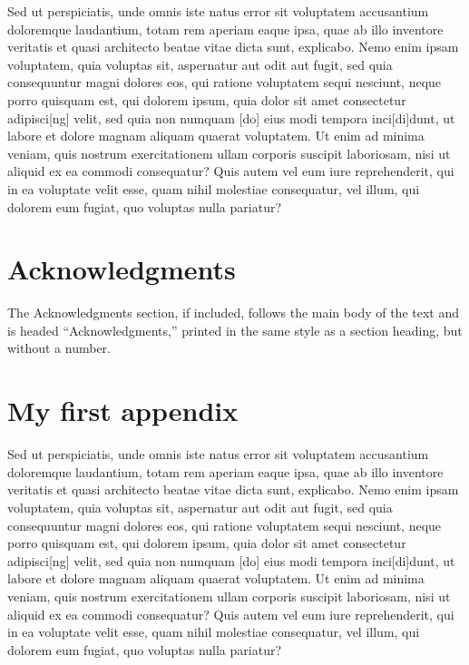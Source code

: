 \documentclass[a4paper,11pt]{article}
\begin{document}
Sed ut perspiciatis, unde omnis iste natus error sit voluptatem accusantium doloremque laudantium, totam rem aperiam eaque ipsa, quae ab illo inventore veritatis et quasi architecto beatae vitae dicta sunt, explicabo. Nemo enim ipsam voluptatem, quia voluptas sit, aspernatur aut odit aut fugit, sed quia consequuntur magni dolores eos, qui ratione voluptatem sequi nesciunt, neque porro quisquam est, qui dolorem ipsum, quia dolor sit amet consectetur adipisci[ng] velit, sed quia non numquam [do] eius modi tempora inci[di]dunt, ut labore et dolore magnam aliquam quaerat voluptatem. Ut enim ad minima veniam, quis nostrum exercitationem ullam corporis suscipit laboriosam, nisi ut aliquid ex ea commodi consequatur? Quis autem vel eum iure reprehenderit, qui in ea voluptate velit esse, quam nihil molestiae consequatur, vel illum, qui dolorem eum fugiat, quo voluptas nulla pariatur?


\section*{Acknowledgments}

The Acknowledgments section, if included,
		       follows the main body of the text and is headed
		       ``Acknowledgments,'' printed in the same style
		       as a section heading, but without a number.

\appendix

\section{My first appendix }

Sed ut perspiciatis, unde omnis iste natus error sit voluptatem accusantium doloremque laudantium, totam rem aperiam eaque ipsa, quae ab illo inventore veritatis et quasi architecto beatae vitae dicta sunt, explicabo. Nemo enim ipsam voluptatem, quia voluptas sit, aspernatur aut odit aut fugit, sed quia consequuntur magni dolores eos, qui ratione voluptatem sequi nesciunt, neque porro quisquam est, qui dolorem ipsum, quia dolor sit amet consectetur adipisci[ng] velit, sed quia non numquam [do] eius modi tempora inci[di]dunt, ut labore et dolore magnam aliquam quaerat voluptatem. Ut enim ad minima veniam, quis nostrum exercitationem ullam corporis suscipit laboriosam, nisi ut aliquid ex ea commodi consequatur? Quis autem vel eum iure reprehenderit, qui in ea voluptate velit esse, quam nihil molestiae consequatur, vel illum, qui dolorem eum fugiat, quo voluptas nulla pariatur?
\end{document}
